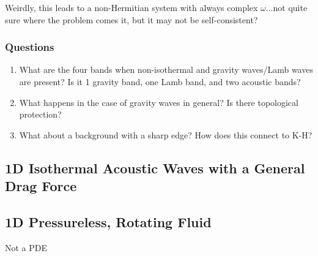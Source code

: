 \documentclass[11pt]{article}
\begin{document}
Weirdly, this leads to a non-Hermitian system with always complex $\omega$...not quite sure where the problem comes it, but it may not be self-consistent?


\subsubsection{Questions}
\label{sec:acoustic_questions}

\begin{enumerate}
\item What are the four bands when non-isothermal and gravity waves/Lamb waves are present? Is it 1 gravity band, one Lamb band, and two acoustic bands?
\item What happens in the case of gravity waves in general? Is there topological protection?
\item What about a background with a sharp edge? How does this connect to K-H?
\end{enumerate}

\subsection{1D Isothermal Acoustic Waves with a General Drag Force }
\label{sec:1D_acoustic_drag}



\subsection{1D Pressureless, Rotating Fluid }
\label{sec:1d_pressureless}

Not a PDE
\end{document}
